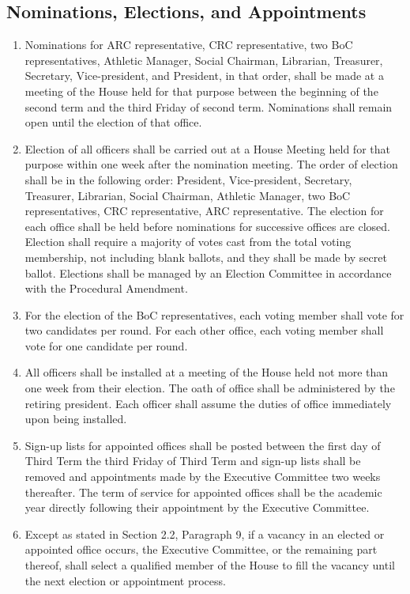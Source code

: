\documentclass[10pt]{article} %
\begin{document}
\subsection{Nominations, Elections, and Appointments}
\begin{enumerate}
\item Nominations for ARC representative, CRC representative, two BoC representatives, Athletic Manager, Social Chairman, Librarian, Treasurer, Secretary, Vice-president, and President, in that order, shall be made at a meeting of the House held for that purpose between the beginning of the second term and the third Friday of second term. Nominations shall remain open until the election of that office.
\item Election of all officers shall be carried out at a House Meeting held for that purpose within one week after the nomination meeting. The order of election shall be in the following order: President, Vice-president, Secretary, Treasurer, Librarian, Social Chairman, Athletic Manager, two BoC representatives, CRC representative, ARC representative. The election for each office shall be held before nominations for successive offices are closed. Election shall require a majority of votes cast from the total voting membership, not including blank ballots, and they shall be made by secret ballot. Elections shall be managed by an Election Committee in accordance with the Procedural Amendment.
\item For the election of the BoC representatives, each voting member shall vote for two candidates per round. For each other office, each voting member shall vote for one candidate per round.
\item All officers shall be installed at a meeting of the House held not more than one week from their election. The oath of office shall be administered by the retiring president. Each officer shall assume the duties of office immediately upon being installed.
\item Sign-up lists for appointed offices shall be posted between the first day of Third Term the third Friday of Third Term and sign-up lists shall be removed and appointments made by the Executive Committee two weeks thereafter. The term of service for appointed offices shall be the academic year directly following their appointment by the Executive Committee.
\item Except as stated in Section 2.2, Paragraph 9, if a vacancy in an elected or appointed office occurs, the Executive Committee, or the remaining part thereof, shall select a qualified member of the House to fill the vacancy until the next election or appointment process.
\end{enumerate}
\end{document}
